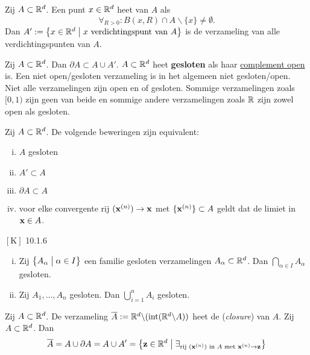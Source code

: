 \documentclass{2wa40summary}
\begin{document}
	 Zij $A \subset \mathbb{R}^d$. Een punt $x \in \mathbb{R}^d$ heet  van $A$ als \[\forall _{R>0}:B(x,R)\cap  A \backslash\{x\} \neq \emptyset.\]
	Dan $A':=\big\{ x \in \mathbb{R}^d \bigm| x \text{ verdichtingspunt van } A\big\}$ is de verzameling van
	alle verdichtingspunten van $A$.
	
	\lemma Zij $A \subset \mathbb{R}^d$. Dan $\partial A \subset A\cup A'$.
	 $A \subset \mathbb{R}^d$ heet \textbf{gesloten} als haar \underline{complement open} is.
	\valkuil Een niet open/gesloten verzameling is in het algemeen niet gesloten/open.
	Niet alle verzamelingen zijn open en of gesloten. Sommige verzamelingen zoals $[0,1)$ zijn geen van beide
	en sommige andere verzamelingen zoals $\mathbb{R}$ zijn zowel open als gesloten.
	
	 Zij $A \subset \mathbb{R}^d$. De volgende beweringen zijn equivalent:
	\begin{enumerate}[(i)]
		\item $A$ gesloten
		\item $A'\subset A$
		\item $\partial A \subset A$
		\item voor elke convergente rij $({\textbf{x}}^{(n)})\to{\textbf{x}}$ met $\lbrace{\textbf{x}}^{(n)}\rbrace\subset A$ geldt dat de limiet in ${\textbf{x}}\in A$.%
	\end{enumerate}
	
	\theorem $\left[\text{K}\right]$ 10.1.6
	\begin{enumerate}[(i)]
		\item Zij $\big\{ A_\alpha \bigm| \alpha \in I \big\}$ een familie gesloten verzamelingen $A_\alpha \subset \mathbb{R}^d$. Dan $\bigcap_{\alpha \in I}A_\alpha$ gesloten.
		\item Zij $A_1, \dots ,A_n$ gesloten. Dan $\bigcup_{i=1}^n A_i$ gesloten.
	\end{enumerate}
	
	 Zij $A \subset \mathbb{R}^d$. De verzameling $\overline{A}:= \mathbb{R}^d \backslash (\operatorname{\mathop{int}} (\mathbb{R}^d \backslash A))$ heet de  (\textit{closure}) van $A$.
	Zij $A \subset \mathbb{R}^d$. Dan
	\[\overline{A}= A \cup \partial A = A \cup A'= \big\{{\textbf{z}} \in \mathbb{R}^d \bigm| \exists _{\text{rij } ({\textbf{x}}^{(n)}) \text{ in } A \text{ met } {\textbf{x}}^{(n)} \to {\textbf{z}}} \big\}\]
	
\end{document}
